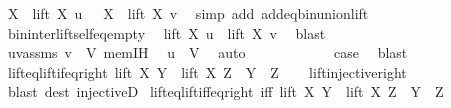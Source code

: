 \begin{isabellebody}
\ {\isachardoublequoteopen}X\ {\isasymunion}\ lift\ X\ u\ \ {\isacharequal}{\kern0pt}\ X\ {\isasymunion}\ lift\ X\ v{\isachardoublequoteclose}\ \isamarkupfalse%
\ {\isacharparenleft}{\kern0pt}simp\ add{\isacharcolon}{\kern0pt}\ add{\isacharunderscore}{\kern0pt}eq{\isacharunderscore}{\kern0pt}bin{\isacharunderscore}{\kern0pt}union{\isacharunderscore}{\kern0pt}lift{\isacharparenright}{\kern0pt}\isanewline
\ \ \ \ \ \ \isamarkupfalse%
\ bin{\isacharunderscore}{\kern0pt}inter{\isacharunderscore}{\kern0pt}lift{\isacharunderscore}{\kern0pt}self{\isacharunderscore}{\kern0pt}eq{\isacharunderscore}{\kern0pt}empty\ \isamarkupfalse%
\ {\isachardoublequoteopen}lift\ X\ u\ {\isacharequal}{\kern0pt}\ lift\ X\ v{\isachardoublequoteclose}\ \isamarkupfalse%
\ blast\isanewline
\ \ \ \ \ \ \isamarkupfalse%
\ uvassms\ {\isacartoucheopen}v\ {\isasymin}\ V{\isacartoucheclose}\ mem{\isachardot}{\kern0pt}IH\ \isamarkupfalse%
\ {\isachardoublequoteopen}u\ {\isasymin}\ V{\isachardoublequoteclose}\ \isamarkupfalse%
\ auto\isanewline
\ \ \ \ \isacommand{{\isacharbraceright}{\kern0pt}}\isamarkupfalse%
\isanewline
\ \ \ \ \isamarkupfalse%
\ \isamarkupfalse%
\ {\isacharquery}{\kern0pt}case\ \isamarkupfalse%
\ blast\isanewline
\ \ \isamarkupfalse%
\isanewline
{}\isamarkupfalse%
%
\endisatagproof
{\isafoldproof}%
%
\isadelimproof
\isanewline
%
\endisadelimproof
\isanewline
{}\isamarkupfalse%
\ lift{\isacharunderscore}{\kern0pt}eq{\isacharunderscore}{\kern0pt}lift{\isacharunderscore}{\kern0pt}if{\isacharunderscore}{\kern0pt}eq{\isacharunderscore}{\kern0pt}right{\isacharcolon}{\kern0pt}\ {\isachardoublequoteopen}lift\ X\ Y\ {\isacharequal}{\kern0pt}\ lift\ X\ Z\ {\isasymLongrightarrow}\ Y\ {\isacharequal}{\kern0pt}\ Z{\isachardoublequoteclose}\isanewline
%
\isadelimproof
\ \ %
\endisadelimproof
%
\isatagproof
{}\isamarkupfalse%
\ lift{\isacharunderscore}{\kern0pt}injective{\isacharunderscore}{\kern0pt}right\ \isamarkupfalse%
\ {\isacharparenleft}{\kern0pt}blast\ dest{\isacharcolon}{\kern0pt}\ injectiveD{\isacharparenright}{\kern0pt}%
\endisatagproof
{\isafoldproof}%
%
\isadelimproof
\isanewline
%
\endisadelimproof
\isanewline
{}\isamarkupfalse%
\ lift{\isacharunderscore}{\kern0pt}eq{\isacharunderscore}{\kern0pt}lift{\isacharunderscore}{\kern0pt}iff{\isacharunderscore}{\kern0pt}eq{\isacharunderscore}{\kern0pt}right\ {\isacharbrackleft}{\kern0pt}iff{\isacharbrackright}{\kern0pt}{\isacharcolon}{\kern0pt}\ {\isachardoublequoteopen}lift\ X\ Y\ {\isacharequal}{\kern0pt}\ lift\ X\ Z\ {\isasymlongleftrightarrow}\ Y\ {\isacharequal}{\kern0pt}\ Z{\isachardoublequoteclose}\isanewline

\end{isabellebody}
